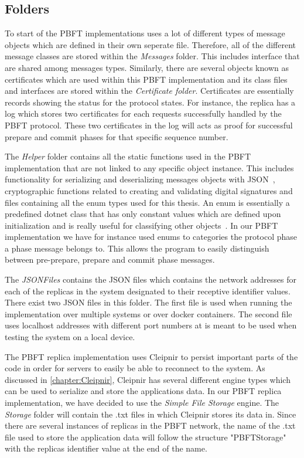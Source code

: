 \subsection{Folders}
To start of the PBFT implementations uses a lot of different types of message objects which are defined in their own seperate file. Therefore, all of the different message classes are stored within the \emph{Messages} folder. This includes interface that are shared among messages types. Similarly, there are several objects known as certificates which are used within this PBFT implementation and its class files and interfaces are stored within the \emph{Certificate folder}. Certificates are essentially records showing the status for the protocol states. For instance, the replica has a log which stores two certificates for each requests successfully handled by the PBFT protocol. These two certificates in the log will acts as proof for successful prepare and commit phases for that specific sequence number. 

The \emph{Helper} folder contains all the static functions used in the PBFT implementation that are not linked to any specific object instance. This includes functionality for serializing and deserializing messages objects with JSON~\cite{WEB:NewJSON}, cryptographic functions related to creating and validating digital signatures and files containing all the enum types used for this thesis. An enum is essentially a predefined dotnet class that has only constant values which are defined upon initialization and is really useful for classifying other objects~\cite{WEB:Enum}. In our PBFT implementation we have for instance used enums to categories the protocol phase a phase message belongs to. This allows the program to easily distinguish between pre-prepare, prepare and commit phase messages.  

The \emph{JSONFiles} contains the JSON files which contains the network addresses for each of the replicas in the system designated to their receptive identifier values. There exist two JSON files in this folder. The first file is used when running the implementation over multiple systems or over docker containers. The second file uses localhost addresses with different port numbers at is meant to be used when testing the system on a local device.

The PBFT replica implementation uses Cleipnir to persist important parts of the code in order for servers to easily be able to reconnect to the system. As discussed in \autoref{chapter:Cleipnir}, Cleipnir has several different engine types which can be used to serialize and store the applications data. In our PBFT replica implementation, we have decided to use the \emph{Simple File Storage} engine. The \emph{Storage} folder will contain the .txt files in which Cleipnir stores its data in. Since there are several instances of replicas in the PBFT network, the name of the .txt file used to store the application data will follow the structure "PBFTStorage" with the replicas identifier value at the end of the name.


